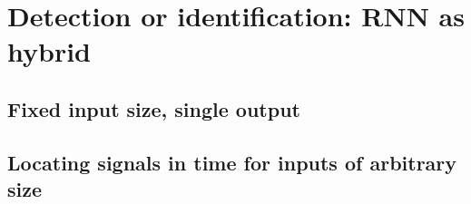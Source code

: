 
\section{Detection or identification: RNN as hybrid}
\red{[TODO]}
\subsection{Fixed input size, single output}
\red{[TODO]}
\subsection{Locating signals in time for inputs of arbitrary size}
\red{[TODO]}